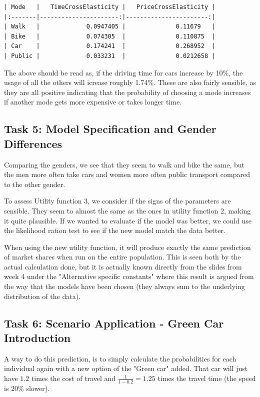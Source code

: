 \documentclass[a4paper,12pt]{article}
\begin{document}
\begin{verbatim}
| Mode   |   TimeCrossElasticity |   PriceCrossElasticity |
|:-------|----------------------:|-----------------------:|
| Walk   |             0.0947405 |              0.11679   |
| Bike   |             0.074305  |              0.110875  |
| Car    |             0.174241  |              0.268952  |
| Public |             0.033231  |              0.0212658 |
\end{verbatim}

The above should be read as, if the driving time for cars increase by 10\%, the usage of all the others will icrease roughly 1.74\%.
These are also fairly sensible, as they are all positive indicating that
the probability of choosing a mode increases if another mode gets more expensive or takes longer time.

\subsection{Task 5: Model Specification and Gender Differences}
Comparing the genders, we see that they seem to walk and bike the same, but the men more often take cars and women more often public transport compared to the other gender.

To assess Utility function 3, we consider if the signs of the parameters are sensible.
They seem to almost the same as the ones in utility function 2, making it quite plausible.
If we wanted to evaluate if the model was better, we could use the likelihood ration test to see if the new model match the data better.

When using the new utility function, it will produce exactly the same prediction of market shares when run on the entire population.
This is seen both by the actual calculation done, but it is actually known directly from the slides from week 4 under the "Alternative specific constants" where this result is argued from the way that the models have been chosen (they always sum to the underlying distribution of the data).


\subsection{Task 6: Scenario Application - Green Car Introduction}
A way to do this prediction, is to simply calculate the probabilities for each individual again with a new option of the "Green car" added.
That car will just have $1.2$ times the cost of travel and $\frac{1}{1-0.2}=1.25$ times the travel time (the speed is $20\%$ slower).
\end{document}
